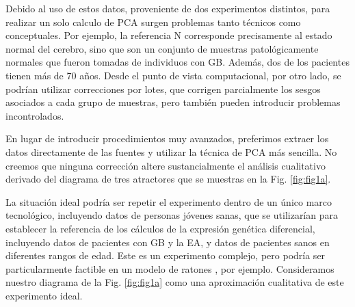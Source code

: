 Debido al uso de estos datos, proveniente de dos experimentos distintos, para realizar un solo calculo de PCA surgen problemas tanto técnicos como conceptuales. Por ejemplo, la referencia N corresponde precisamente al estado normal del cerebro, sino que son un conjunto de muestras patológicamente normales que fueron tomadas de individuos con GB. Además, dos de los pacientes tienen más de 70 años. Desde el punto de vista computacional, por otro lado, se podrían utilizar correcciones por lotes\cite{haghverdi2018batch, zhang2020combat}, que corrigen parcialmente los sesgos asociados a cada grupo de muestras, pero también pueden introducir problemas incontrolados.

En lugar de introducir procedimientos muy avanzados, preferimos extraer los datos directamente de las fuentes y utilizar la técnica de PCA más sencilla. No creemos que ninguna corrección altere sustancialmente el análisis cualitativo derivado del diagrama de tres atractores que se muestras en la Fig. \ref{fig:fig1a}.

La situación ideal podría ser repetir el experimento dentro de un único marco tecnológico, incluyendo datos de personas jóvenes sanas, que se utilizarían para establecer la referencia de los cálculos de la expresión genética diferencial, incluyendo datos de pacientes con GB y la EA, y datos de pacientes sanos en diferentes rangos de edad. Este es un experimento complejo, pero podría ser particularmente factible en un modelo de ratones \cite{hahn2023atlas}, por ejemplo. Consideramos nuestro diagrama de la Fig. \ref{fig:fig1a} como una aproximación cualitativa de este experimento ideal.